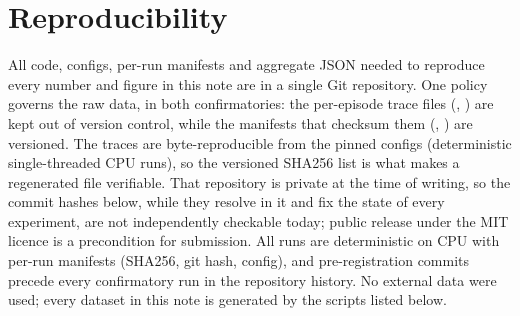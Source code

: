 \documentclass[11pt]{article}
\theoremstyle{definition}
\theoremstyle{remark}
\begin{document}
\section{Reproducibility}\label{sec:repro}

All code, configs, per-run manifests and aggregate JSON needed to reproduce
every number and figure in this note are in a single Git repository. One
policy governs the raw data, in both confirmatories: the per-episode trace
files (, ) are kept
out of version control, while the manifests that checksum them
(, ) are
versioned. The traces are byte-reproducible from the pinned configs
(deterministic single-threaded CPU runs), so the versioned SHA256 list is what
makes a regenerated file verifiable. That repository is private at the time of
writing, so the commit hashes below, while they resolve in it and fix the
state of every experiment, are not independently checkable today; public
release under the MIT licence is a precondition for submission. All runs are
deterministic on CPU with per-run manifests (SHA256, git hash, config), and
pre-registration commits precede every confirmatory run in the repository
history. No external data were used; every dataset in this note is generated
by the scripts listed below.
\end{document}

